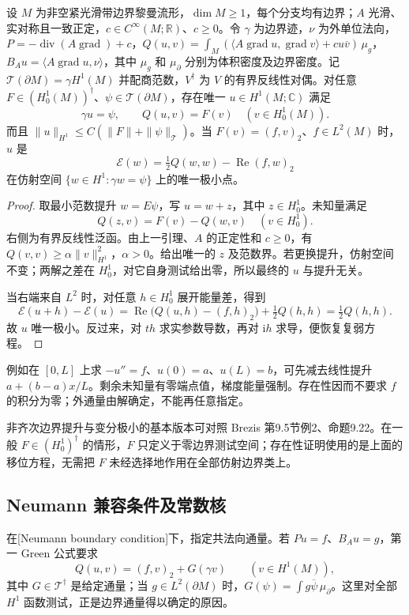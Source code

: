 \begin{theorem}\label{g3:thm:weak-general-dirichlet}
	设 \(M\) 为非空紧光滑带边界黎曼流形，\(\dim M\ge1\)，每个分支均有边界；\(A\) 光滑、实对称且一致正定，\(c\in C^\infty(M;\mathbb R)\)、\(c\ge0\)。令 \(\gamma\) 为边界迹，\(\nu\) 为外单位法向，\(P=-\operatorname{div}(A\operatorname{grad})+c\)，\(Q(u,v)=\int_M(\langle A\operatorname{grad}u,\operatorname{grad}v\rangle+cu\overline v)\,\mu_g\)，\(B_Au=\langle A\operatorname{grad}u,\nu\rangle\)，其中 \(\mu_g\) 和 \(\mu_\partial\) 分别为体积密度及边界密度。记 \(\mathcal T(\partial M)=\gamma H^1(M)\) 并配商范数，\(V^\dagger\) 为 \(V\) 的有界反线性对偶。对任意 \(F\in(H_0^1(M))^\dagger\)、\(\psi\in\mathcal T(\partial M)\)，存在唯一 \(u\in H^1(M;\mathbb C)\) 满足
	\[
		\gamma u=\psi,\qquad Q(u,v)=F(v)\quad(v\in H_0^1(M)).
	\]
	而且 \(\|u\|_{H^1}\le C(\|F\|+\|\psi\|_{\mathcal T})\)。当 \(F(v)=(f,v)_2\)、\(f\in L^2(M)\) 时，\(u\) 是
	\[
		\mathcal E(w)=\tfrac12Q(w,w)-\operatorname{Re}(f,w)_2
	\]
	在仿射空间 \(\{w\in H^1:\gamma w=\psi\}\) 上的唯一极小点。
\end{theorem}
\begin{proof}
	取最小范数提升 \(w=E\psi\)，写 \(u=w+z\)，其中 \(z\in H_0^1\)。未知量满足
	\[
		Q(z,v)=F(v)-Q(w,v)\quad(v\in H_0^1).
	\]
	右侧为有界反线性泛函。由上一引理、\(A\) 的正定性和 \(c\ge0\)，有 \(Q(v,v)\ge\alpha\|v\|_{H^1}^2\)，\(\alpha>0\)。给出唯一的 \(z\) 及范数界。若更换提升，仿射空间不变；两解之差在 \(H_0^1\)，对它自身测试给出零，所以最终的 \(u\) 与提升无关。

	当右端来自 \(L^2\) 时，对任意 \(h\in H_0^1\) 展开能量差，得到
	\[
		\mathcal E(u+h)-\mathcal E(u)
		=\operatorname{Re}\bigl(Q(u,h)-(f,h)_2\bigr)+\tfrac12Q(h,h)
		=\tfrac12Q(h,h).
	\]
	故 \(u\) 唯一极小。反过来，对 \(th\) 求实参数导数，再对 \(\mathrm ih\) 求导，便恢复复弱方程。
\end{proof}

例如在 \([0,L]\) 上求 \(-u''=f\)、\(u(0)=a\)、\(u(L)=b\)，可先减去线性提升 \(a+(b-a)x/L\)。剩余未知量有零端点值，梯度能量强制。存在性因而不要求 \(f\) 的积分为零；外通量由解确定，不能再任意指定。

\ProseParagraphBreak

非齐次边界提升与变分极小的基本版本可对照 Brezis 第9.5节例2、命题9.22\cite[第9.5节例2，命题9.22]{Brezis2011}。在一般 \(F\in(H_0^1)^\dagger\) 的情形，\(F\) 只定义于零边界测试空间；存在性证明使用的是上面的移位方程，无需把 \(F\) 未经选择地作用在全部仿射边界类上。

\subsection{Neumann 兼容条件及常数核}
\label{g3:subsec:1401:03}
在[Neumann boundary condition]下，指定共法向通量。若 \(Pu=f\)、\(B_Au=g\)，第一 Green 公式要求
\begin{equation}\label{g3:eq:weak-neumann-form}
	Q(u,v)=(f,v)_2+G(\gamma v)\qquad(v\in H^1(M)),
\end{equation}
其中 \(G\in\mathcal T^\dagger\) 是给定通量；当 \(g\in L^2(\partial M)\) 时，\(G(\psi)=\int g\overline\psi\,\mu_{\partial}\)。这里对全部 \(H^1\) 函数测试，正是边界通量得以确定的原因。

